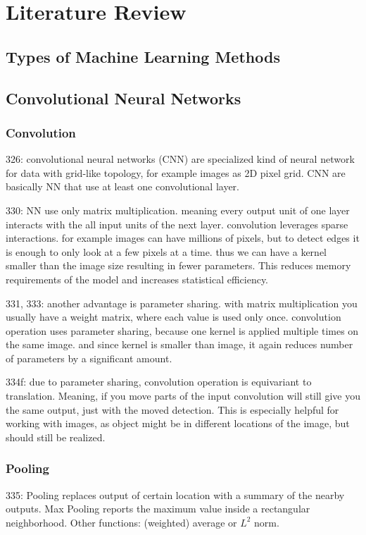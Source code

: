 \section{Literature Review}

\subsection{Types of Machine Learning Methods}

\subsection{Convolutional Neural Networks}

\subsubsection{Convolution}
\cite{DLbook16}
326: convolutional neural networks (CNN) are specialized kind of neural network for data with grid-like topology, for example images as 2D pixel grid. CNN are basically NN that use at least one convolutional layer.

330: NN use only matrix multiplication. meaning every output unit of one layer interacts with the all input units of the next layer. convolution leverages sparse interactions. for example images can have millions of pixels, but to detect edges it is enough to only look at a few pixels at a time. thus we can have a kernel smaller than the image size resulting in fewer parameters. This reduces memory requirements of the model and increases statistical efficiency.

331, 333: another advantage is parameter sharing. with matrix multiplication you usually have a weight matrix, where each value is used only once. convolution operation uses parameter sharing, because one kernel is applied multiple times on the same image. and since kernel is smaller than image, it again reduces number of parameters by a significant amount.

334f: due to parameter sharing, convolution operation is equivariant to translation. Meaning, if you move parts of the input convolution will still give you the same output, just with the moved detection. This is especially helpful for working with images, as object might be in different locations of the image, but should still be realized.

\subsubsection{Pooling}
\cite{DLbook16}
335: Pooling replaces output of certain location with a summary of the nearby outputs. Max Pooling reports the maximum value inside a rectangular neighborhood. Other functions: (weighted) average or $L^2$ norm.


